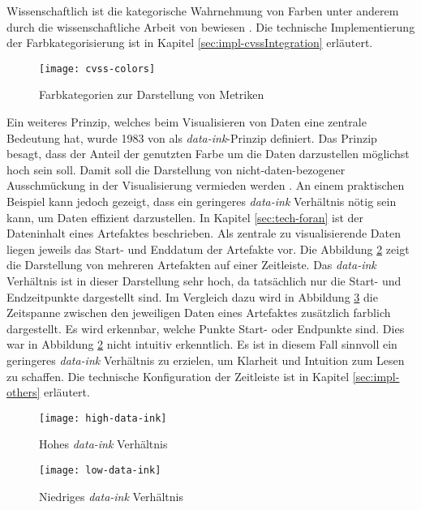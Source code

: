 Wissenschaftlich ist die kategorische Wahrnehmung von Farben unter anderem durch die wissenschaftliche Arbeit von \citeauthor{cliffordColorCategoriesAffect2010} bewiesen \autocite{cliffordColorCategoriesAffect2010}. Die technische Implementierung der Farbkategorisierung ist in Kapitel \ref{sec:impl-cvssIntegration} erläutert.
%
\begin{figure}[H]
    \centering
    \texttt{[image: cvss-colors]}
    \caption{Farbkategorien zur Darstellung von Metriken}
    \label{fig:cvss-colors}
\end{figure}
%
\par Ein weiteres Prinzip, welches beim Visualisieren von Daten eine zentrale Bedeutung hat, wurde 1983 von \citeauthor{tufteBookReviewsVisual1984} als \textit{data-ink}-Prinzip definiert. Das Prinzip besagt, dass der Anteil der genutzten Farbe um die Daten darzustellen möglichst hoch sein soll. Damit soll die Darstellung von nicht-daten-bezogener Ausschmückung in der Visualisierung vermieden werden \autocite{tufteBookReviewsVisual1984}. An einem praktischen Beispiel kann jedoch gezeigt, dass ein geringeres \textit{data-ink} Verhältnis nötig sein kann, um Daten effizient darzustellen. In Kapitel \ref{sec:tech-foran} ist der Dateninhalt eines Artefaktes beschrieben. Als zentrale zu visualisierende Daten liegen jeweils das Start- und Enddatum der Artefakte vor. Die Abbildung \ref{fig:high-data-ink} zeigt die Darstellung von mehreren Artefakten auf einer Zeitleiste. Das \textit{data-ink} Verhältnis ist in dieser Darstellung sehr hoch, da tatsächlich nur die Start- und Endzeitpunkte dargestellt sind. Im Vergleich dazu wird in Abbildung \ref{fig:low-data-ink} die Zeitspanne zwischen den jeweiligen Daten eines Artefaktes zusätzlich farblich dargestellt. Es wird erkennbar, welche Punkte Start- oder Endpunkte sind. Dies war in Abbildung \ref{fig:high-data-ink} nicht intuitiv erkenntlich. Es ist in diesem Fall sinnvoll ein geringeres \textit{data-ink} Verhältnis zu erzielen, um Klarheit und Intuition zum Lesen zu schaffen. Die technische Konfiguration der Zeitleiste ist in Kapitel \ref{sec:impl-others} erläutert.
%
\begin{figure}[H]
    \centering
    \texttt{[image: high-data-ink]}
    \caption{Hohes \textit{data-ink} Verhältnis}
    \label{fig:high-data-ink}
\end{figure}
%
\begin{figure}[H]
    \centering
    \texttt{[image: low-data-ink]}
    \caption{Niedriges \textit{data-ink} Verhältnis}
    \label{fig:low-data-ink}
\end{figure}

